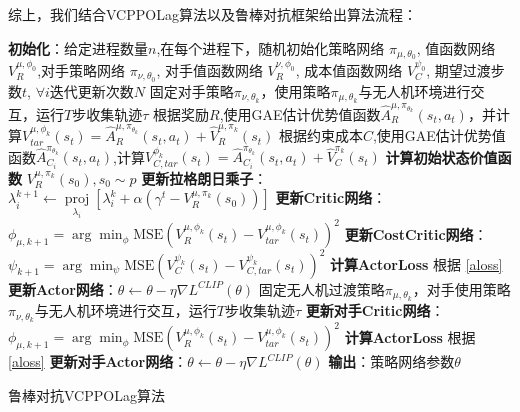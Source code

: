 综上，我们结合VCPPOLag算法以及鲁棒对抗框架给出算法流程：
\begin{algorithm}[H]
    \begin{algorithmic}[1] %
        \STATE \textbf{初始化}：给定进程数量$n$,在每个进程下，随机初始化策略网络 $\pi_{\mu,\theta_{0}}$, 值函数网络 $V_{R}^{\mu,\phi_{0}}$,对手策略网络 $\pi_{\nu,\theta_{0}}$, 对手值函数网络 $V_{R}^{\nu,\phi_{0}}$, 成本值函数网络 $V_{C}^{\psi_{0}}$, 期望过渡步数$t$, $\forall i$迭代更新次数$N$
        \STATE 固定对手策略$\pi_{\nu,\theta_{k}}$，使用策略$\pi_{\mu,\theta_{k}}$与无人机环境进行交互，运行$T$步收集轨迹$\tau$
        \STATE 根据奖励$R$,使用GAE估计优势值函数$\hat{A}_{R}^{\mu,\pi_{\theta_{k}}}\left(s_{t}, a_{t}\right)$，并计算$V_{tar}^{\mu,\phi_{k}}\left(s_{t}\right)=\hat{A}_{R}^{\mu,\pi_{\theta_{k}}}\left(s_{t}, a_{t}\right)+\hat{V}_{R}^{\mu,\pi_{k}}(s_{t})$
        \STATE 根据约束成本$C$,使用GAE估计优势值函数$\hat{A}_{C_{i}}^{\pi_{\theta_{k}}}\left(s_{t}, a_{t}\right)$,计算$V_{C,tar}^{\phi_{k}}\left(s_{t}\right)=\hat{A}_{C_{i}}^{\pi_{\theta_{k}}}\left(s_{t}, a_{t}\right)+\hat{V}_{C}^{\pi_{k}}(s_{t})$
                    \STATE \textbf{计算初始状态价值函数} ${V}_{R}^{\mu,\pi_{k}}(s_{0}),s_{0}\sim p$
                    \STATE \textbf{更新拉格朗日乘子}：$\lambda_{i}^{k+1} \leftarrow \underset{\lambda_{i}}{\operatorname{proj}}\left[\lambda_{i}^{k}+\alpha\left(\gamma^{t}-{V}_{R}^{\mu,\pi_{k}}(s_{0})\right)\right]$
                    \STATE \textbf{更新Critic网络}：$\phi_{\mu,k+1}=\arg \min _{\phi}\text{MSE}\left(V_{R}^{\mu,\phi_{k}}\left(s_{t}\right)-V_{tar}^{\mu,\phi_{k}}\left(s_{t}\right)\right)^{2}$
                    \STATE \textbf{更新CostCritic网络}：$\psi_{k+1}=\arg \min _{\psi}\text{MSE}\left(V_{C}^{\psi_{k}}\left(s_{t}\right)-V_{C,tar}^{\psi_{k}}\left(s_{t}\right)\right)^{2}$
                    \STATE \textbf{计算ActorLoss} 根据 \autoref{aloss}
                    \STATE \textbf{更新Actor网络}：$\theta \leftarrow \theta-\eta \nabla L^{C L I P}(\theta)$
                \ENDFOR
                \STATE 固定无人机过渡策略$\pi_{\mu,\theta_{k}}$，对手使用策略$\pi_{\nu,\theta_{k}}$与无人机环境进行交互，运行$T$步收集轨迹$\tau$
                    \STATE \textbf{更新对手Critic网络}：$\phi_{\mu,k+1}=\arg \min _{\phi}\text{MSE}\left(V_{R}^{\mu,\phi_{k}}\left(s_{t}\right)-V_{tar}^{\mu,\phi_{k}}\left(s_{t}\right)\right)^{2}$
                    \STATE \textbf{计算ActorLoss} 根据 \autoref{aloss}
                    \STATE \textbf{更新对手Actor网络}：$\theta \leftarrow \theta-\eta \nabla L^{C L I P}(\theta)$
                \ENDFOR
            \ENDFOR
        \ENDFOR
        \STATE \textbf{输出}：策略网络参数$\theta$
    \end{algorithmic}
    \caption{\label{alg:ppolag}鲁棒对抗VCPPOLag算法}
\end{algorithm}
